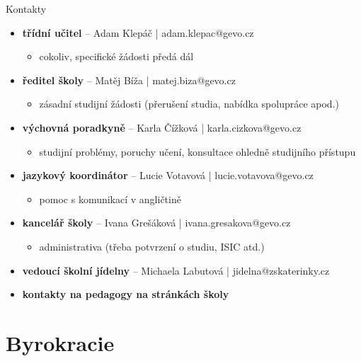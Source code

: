 \documentclass[
		czech,
		sections numbered,
		xcolor=dvipsnames,
		aspectratio=169,
]{beamer}
\begin{document}
\begin{frame}{Kontakty}
		\begin{itemize}
				\item \textbf<1>{třídní učitel} -- Adam Klepáč | \alert{adam.klepac@gevo.cz}
						\begin{itemize}
								\item cokoliv, specifické žádosti předá dál
						\end{itemize}
						\pause
				\item \textbf<2>{ředitel školy} -- Matěj Bíža | \alert{matej.biza@gevo.cz}
						\begin{itemize}
								\item zásadní studijní žádosti (přerušení studia, nabídka
										spolupráce apod.)
						\end{itemize}
						\pause
				\item \textbf<3>{výchovná poradkyně} -- Karla Čížková |
						\alert{karla.cizkova@gevo.cz}
						\begin{itemize}
								\item studijní problémy, poruchy učení, konsultace ohledně studijního
										přístupu
						\end{itemize}
						\pause
				\item \textbf<4>{jazykový koordinátor} -- Lucie Votavová |
						\alert{lucie.votavova@gevo.cz}
						\begin{itemize}
								\item pomoc s komunikací v angličtině
						\end{itemize}
						\pause
				\item \textbf<5>{kancelář školy} -- Ivana Grešáková |
						\alert{ivana.gresakova@gevo.cz}
						\begin{itemize}
								\item administrativa (třeba potvrzení o studiu, ISIC atd.)
						\end{itemize}
						\pause
				\item \textbf<6>{vedoucí školní jídelny} -- Michaela Labutová |
						\alert{jidelna@zskaterinky.cz}
						\pause
				\item \textbf<7>{kontakty na pedagogy na stránkách školy}
		\end{itemize}
\end{frame}

\section{Byrokracie}
\label{sec:byrokracie}
\end{document}
